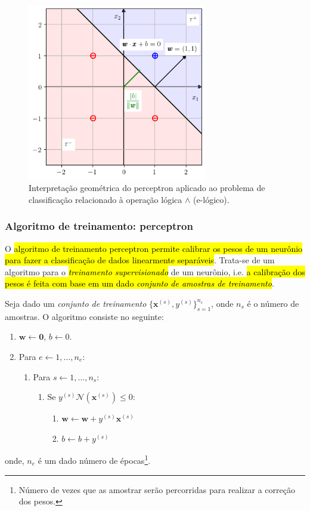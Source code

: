 \begin{figure}[H]
  \centering
  \includegraphics[width=0.7\textwidth]{./cap_perceptron/dados/fig_class_e/main}
  \caption{Interpretação geométrica do perceptron aplicado ao problema de classificação relacionado à operação lógica $\land$ (e-lógico).}
  \label{fig:class_e}
\end{figure}

\subsubsection{Algoritmo de treinamento: perceptron}

O \hl{algoritmo de treinamento perceptron permite calibrar os pesos de um neurônio para fazer a classificação de dados linearmente separáveis}. Trata-se de um algoritmo para o \hl{\emph{treinamento supervisionado}} de um neurônio, i.e. \hl{a calibração dos pesos é feita com base em um dado \emph{conjunto de amostras de treinamento}}.

Seja dado um \emph{conjunto de treinamento} $\{\pmb{x}^{(s)},y^{(s)}\}_{s=1}^{n_s}$, onde $n_s$ é o número de amostras. O algoritmo consiste no seguinte:
\begin{enumerate}
\item $\pmb{w} \leftarrow\pmb{0}$, $b \leftarrow 0$.
\item Para $e \leftarrow 1,\dotsc, n_e$:
  \begin{enumerate}
  \item Para $s \leftarrow 1,\dotsc, n_s$:
    \begin{enumerate}
    \item Se $y^{(s)}\mathcal{N}\left(\pmb{x}^{(s)}\right) \leq 0$:
      \begin{enumerate}
      \item $\pmb{w} \leftarrow \pmb{w}+y^{(s)}\pmb{x}^{(s)}$
      \item $b \leftarrow b + y^{(s)}$
      \end{enumerate}
    \end{enumerate}
  \end{enumerate}
\end{enumerate}
onde, $n_e$ é um dado número de épocas\footnote{Número de vezes que as amostrar serão percorridas para realizar a correção dos pesos.}.

